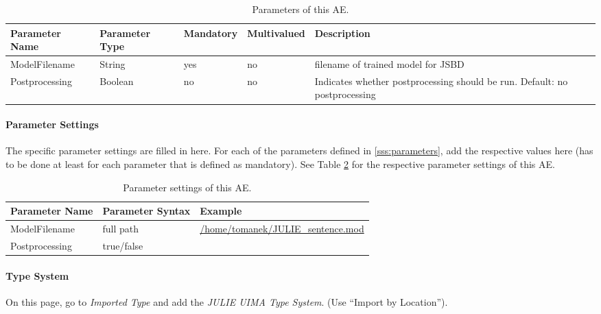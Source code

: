 \documentclass[11pt,a4paper,halfparskip]{scrartcl}
\begin{document}
\begin{table}[h!]
  \centering
  \begin{tabular}{|p{4cm}|p{2cm}|p{2cm}|p{2cm}|p{4cm}|}
    \hline
    Parameter Name & Parameter Type & Mandatory & Multivalued & Description \\
    \hline\hline
    ModelFilename & String & yes & no & filename of trained model for
    JSBD\\
    \hline
    Postprocessing & Boolean & no & no & Indicates whether postprocessing should be run. Default: no postprocessing\\
    \hline
  \end{tabular}
  \caption{Parameters of this AE.}
  \label{tab:parameters}
\end{table}


\paragraph{Parameter Settings}
\label{sss:param_settings}

The specific parameter settings are filled in here. For each of the
parameters defined in \ref{sss:parameters}, add the respective values
here (has to be done at least for each parameter that is defined as
mandatory). See Table \ref{tab:param_settings} for the respective
parameter settings of this AE.

\begin{table}[h!]
  \centering
  \begin{tabular}{|p{4cm}|p{4cm}|p{7cm}|}
    \hline
    Parameter Name & Parameter Syntax & Example \\
    \hline\hline
    ModelFilename & full path & \url{/home/tomanek/JULIE_sentence.mod}\\
    \hline
    Postprocessing & true/false &\\
  \hline
  \end{tabular}
  \caption{Parameter settings of this AE.}
  \label{tab:param_settings}
\end{table}

\paragraph{Type System}
\label{sss:type_system}
On this page, go to \emph{Imported Type} and add the \emph{JULIE UIMA
  Type System}. (Use ``Import by Location'').
\end{document}
